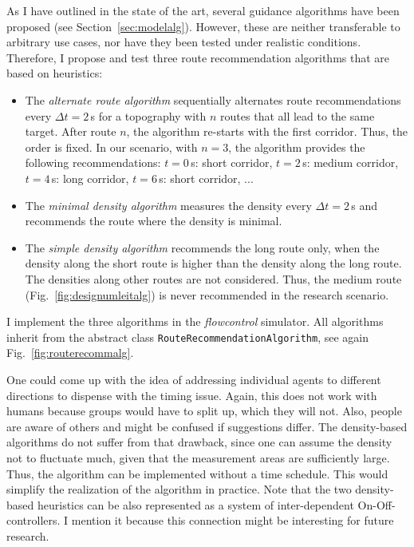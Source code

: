 As I have outlined in the state of the art, several guidance algorithms have been proposed (see Section~\ref{sec:modelalg}). However, these are neither transferable to arbitrary use cases, nor have they been tested under realistic conditions. Therefore, I propose and test three route recommendation algorithms that are based on heuristics: 
 
\begin{itemize}
\item  
The \textit{alternate route algorithm}
sequentially  alternates route recommendations every $\Delta t=2$\,s for a topography with $n$ routes that all lead to the same target.  
After route $n$, the algorithm re-starts with the first corridor. Thus, the order is fixed. In our scenario, with $n=3$, the algorithm provides the following recommendations:  $t=0$\,s: short corridor, $t=2$\,s: medium corridor, $t=4$\,s: long corridor, $t=6$\,s: short corridor, ...   
\item  The \textit{minimal density algorithm} measures the density every $\Delta t=2$\,s and recommends the route where the density is minimal. 
\item The \textit{simple density algorithm} recommends the long route only, when the density along the short route is higher than the density along the long route. The densities along other routes are not considered. Thus, the medium route (Fig.~\ref{fig:designumleitalg})  is never recommended in the research scenario.
\end{itemize}

I implement the three algorithms in the \textit{flowcontrol} simulator. All algorithms inherit from the abstract class \lstinline{RouteRecommendationAlgorithm}, see again Fig.~\ref{fig:routerecommalg}. 



One could come up with the idea of addressing individual agents to different directions to dispense with the timing issue.
Again, this does not work with humans because groups would have to split up, which they will not. Also, people are aware of others and might be confused if suggestions differ.
The density-based algorithms do not suffer from that drawback, since one can assume the density not to fluctuate much, given that the measurement areas are sufficiently large. Thus, the algorithm can be implemented without a time schedule. This would simplify the realization of the algorithm in practice.
%
Note that the two density-based heuristics can be also represented as a system of inter-dependent On-Off-controllers. I mention it because this connection might be interesting for future research.



